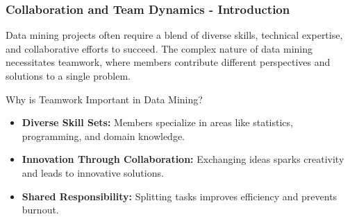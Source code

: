 \documentclass[aspectratio=169]{beamer}
\begin{document}
\begin{frame}[fragile]
    \frametitle{Collaboration and Team Dynamics - Introduction}
    Data mining projects often require a blend of diverse skills, technical expertise, and collaborative efforts to succeed. The complex nature of data mining necessitates teamwork, where members contribute different perspectives and solutions to a single problem.

    \begin{block}{Why is Teamwork Important in Data Mining?}
        \begin{itemize}
            \item \textbf{Diverse Skill Sets:} Members specialize in areas like statistics, programming, and domain knowledge.
            \item \textbf{Innovation Through Collaboration:} Exchanging ideas sparks creativity and leads to innovative solutions.
            \item \textbf{Shared Responsibility:} Splitting tasks improves efficiency and prevents burnout.
        \end{itemize}
    \end{block}
\end{frame}
\end{document}
